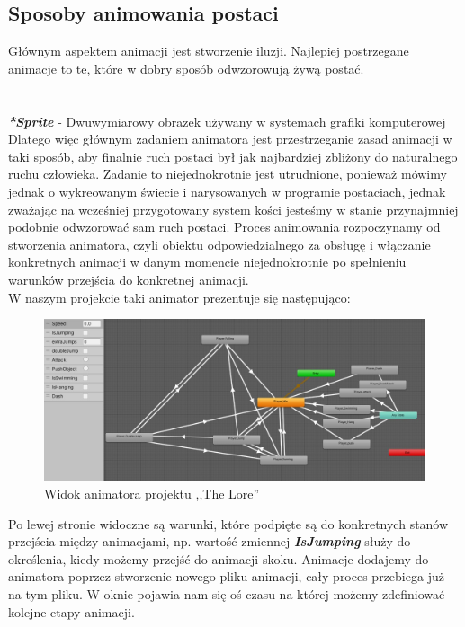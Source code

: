 \documentclass[oneside,polski,logo]{amuthesis}
\begin{document}
\subsection{Sposoby animowania postaci}
Głównym aspektem animacji jest stworzenie iluzji. Najlepiej postrzegane animacje to te, które w dobry sposób odwzorowują żywą postać.\\
\noindent\makebox[\linewidth]{\rule{15cm}{0.4pt}}\\
\\
\textbf{\textit{*Sprite}} - Dwuwymiarowy obrazek używany w systemach grafiki komputerowej \newpage
Dlatego więc głównym zadaniem animatora jest przestrzeganie zasad animacji w taki sposób, aby finalnie ruch postaci był jak najbardziej zbliżony do naturalnego ruchu człowieka.
 Zadanie to niejednokrotnie jest utrudnione, ponieważ mówimy jednak o wykreowanym świecie i narysowanych w programie postaciach, jednak zważając na wcześniej przygotowany system kości jesteśmy w stanie przynajmniej podobnie odwzorować sam ruch postaci. 
Proces animowania rozpoczynamy od stworzenia animatora, czyli obiektu odpowiedzialnego za obsługę i włączanie konkretnych animacji w danym momencie niejednokrotnie po spełnieniu warunków przejścia do konkretnej animacji. \cite{animation1} \\
W naszym projekcie taki animator prezentuje się następująco:

\begin{figure}[h]
	\centering
	\includegraphics[width=13cm]{images/kozubal/animator.jpg}
	\caption{Widok animatora projektu ,,The Lore''}
\end{figure}

Po lewej stronie widoczne są warunki, które podpięte są do konkretnych stanów przejścia między animacjami, np. wartość zmiennej \textbf{\textit{IsJumping}} służy do określenia, kiedy możemy przejść do animacji skoku. Animacje dodajemy do animatora poprzez stworzenie nowego pliku animacji, cały proces przebiega już na tym pliku. W oknie pojawia nam się oś czasu na której możemy zdefiniować kolejne etapy animacji.\\
\end{document}
